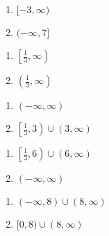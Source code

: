 \begin{multicols}{2}
\begin{enumerate}
\setcounter{enumi}{\value{HW}}

\item  $[-3, \infty)$

\item $(-\infty, 7]$  

\setcounter{HW}{\value{enumi}}
\end{enumerate}
\end{multicols}

\begin{multicols}{2}
\begin{enumerate}
\setcounter{enumi}{\value{HW}}

\item    $\left[ \frac{1}{3}, \infty \right)$


\item   $\left( \frac{1}{3}, \infty \right)$





\setcounter{HW}{\value{enumi}}
\end{enumerate}
\end{multicols}

\begin{multicols}{2}
\begin{enumerate}
\setcounter{enumi}{\value{HW}}

\item   $(-\infty, \infty)$

\item   $\left[ \frac{1}{3}, 3 \right) \cup (3, \infty)$



\setcounter{HW}{\value{enumi}}
\end{enumerate}
\end{multicols}

\begin{multicols}{2}
\begin{enumerate}
\setcounter{enumi}{\value{HW}}

\item  $\left[ \frac{1}{3}, 6 \right) \cup (6, \infty)$

\item   $(-\infty, \infty)$


\setcounter{HW}{\value{enumi}}
\end{enumerate}
\end{multicols}

\begin{multicols}{2}
\begin{enumerate}
\setcounter{enumi}{\value{HW}}

\item $(-\infty, 8) \cup (8, \infty)$
\item $[0, 8) \cup (8, \infty)$


\setcounter{HW}{\value{enumi}}
\end{enumerate}
\end{multicols}

